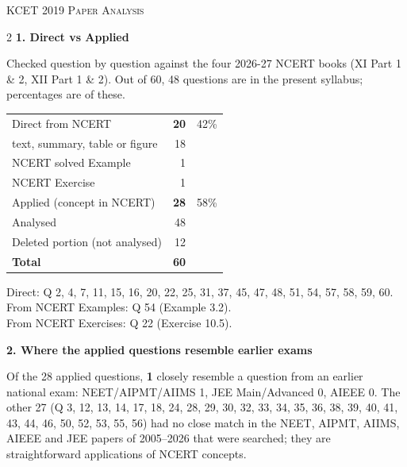 \clearpage
\begin{center}{}\par
{\fontsize{20}{24}\selectfont\color{navy}\scshape KCET 2019 \textperiodcentered{} Paper Analysis}\par
{\color{gilt}}\end{center}
\vspace{4pt}
\begin{multicols}{2}
\textbf{\color{crimson}1. Direct vs Applied}\par\smallskip
{\footnotesize Checked question by question against the four 2026-27 NCERT books (XI Part 1 \& 2, XII Part 1 \& 2). Out of 60, 48 questions are in the present syllabus; percentages are of these.}\par\smallskip
\begin{tabular}{@{}lrr@{}}\toprule
Direct from NCERT & \textbf{20} & 42\%\\
\quad text, summary, table or figure & 18 &\\
\quad NCERT solved Example & 1 &\\
\quad NCERT Exercise & 1 &\\
Applied (concept in NCERT) & \textbf{28} & 58\%\\\midrule
Analysed & 48 &\\
Deleted portion (not analysed) & 12 &\\\midrule
\textbf{Total} & \textbf{60} &\\\bottomrule\end{tabular}\par\smallskip
{\footnotesize Direct: Q 2, 4, 7, 11, 15, 16, 20, 22, 25, 31, 37, 45, 47, 48, 51, 54, 57, 58, 59, 60.\\ From NCERT Examples: Q 54 (Example 3.2).\\ From NCERT Exercises: Q 22 (Exercise 10.5).}\par\medskip
\textbf{\color{crimson}2. Where the applied questions resemble earlier exams}\par\smallskip
Of the 28 applied questions, \textbf{1} closely resemble a question from an earlier national exam:
NEET/AIPMT/AIIMS 1, JEE Main/Advanced 0, AIEEE 0. The other 27 (Q 3, 12, 13, 14, 17, 18, 24, 28, 29, 30, 32, 33, 34, 35, 36, 38, 39, 40, 41, 43, 44, 46, 50, 52, 53, 55, 56) had no close match in the NEET, AIPMT, AIIMS, AIEEE and JEE papers of 2005--2026 that were searched; they are straightforward applications of NCERT concepts.\par

\end{multicols}

